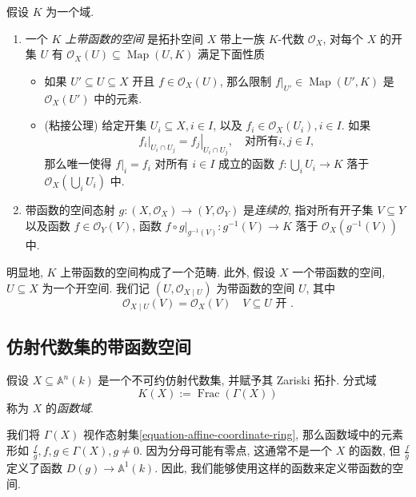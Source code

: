 假设 \( K \) 为一个域.
\begin{enumerate}
  \item 一个 \emph{\( K \) 上带函数的空间} 是拓扑空间 \( X \) 带上一族 \( K
    \)-代数 \( \mathscr{O}_X \), 对每个 \( X \) 的开集 \( U \) 有 \(
    \mathscr{O}_X(U) \subseteq \operatorname{Map}(U, K) \) 满足下面性质
    \begin{itemize}
      \item 如果 \( U' \subseteq U \subseteq X \) 开且 \( f \in \mathscr{O}_X(U)
        \), 那么限制 \( \left. f \right\vert_{U'} \in \operatorname{Map}(U', K)
          \) 是 \( \mathscr{O}_X(U') \) 中的元素.
        \item (粘接公理) 给定开集 \( U_i \subseteq X, i \in I \), 以及 \( f_i
          \in \mathscr{O}_X(U_i), i \in I \). 如果
          \[
            \left. f_i \right\vert_{U_i \cap U_j} = \left. f_j \right\vert_{U_i
                \cap U_j},\quad \text{对所有} i, j \in I,
          \]
          那么唯一使得 \( \left. f \right\vert_{i} = f_i \) 对所有 \( i \in I \)
            成立的函数 \( f: \bigcup_i U_i \to K \) 落于 \(
            \mathscr{O}_X(\bigcup_i U_i) \) 中.
    \end{itemize}
  \item 带函数的空间态射 \( g: (X, \mathscr{O}_X) \to (Y, \mathscr{O}_Y) \)
    是\emph{连续的}, 指对所有开子集 \( V \subseteq Y \) 以及函数 \( f \in
    \mathcal{O}_Y(V) \), 函数 \( f \circ \left. g \right\vert_{g^{-1}(V)}:
      g^{-1}(V) \to K \) 落于 \( \mathscr{O}_X(g^{-1}(V)) \) 中.
\end{enumerate}

明显地, \( K \) 上带函数的空间构成了一个范畴.
此外, 假设 \( X \) 一个带函数的空间, \( U \subseteq X \) 为一个开空间. 我们记 \(
(U, \mathscr{O}_{X \mid U})\) 为带函数的空间 \( U \), 其中
\[
  \mathscr{O}_{X \mid U} (V) = \mathscr{O}_X(V) \quad V \subseteq U \text{ 开 }.
\]

\subsection{仿射代数集的带函数空间}

假设 \( X \subseteq \mathbb{A}^n(k) \) 是一个不可约仿射代数集, 并赋予其 Zariski
拓扑. 分式域
\[
  K(X) := \operatorname{Frac}(\Gamma(X))
\]
称为 \( X \) 的\emph{函数域}.

我们将 \( \Gamma(X) \) 视作态射集\eqref{equation-affine-coordinate-ring},
那么函数域中的元素形如 \( \frac{f}{g}, f, g \in \Gamma(X), g \neq 0 \).
因为分母可能有零点, 这通常不是一个 \( X \) 的函数, 但 \( \frac{f}{g} \)
定义了函数 \( D(g) \to \mathbb{A}^1(k) \). 因此,
我们能够使用这样的函数来定义带函数的空间.

